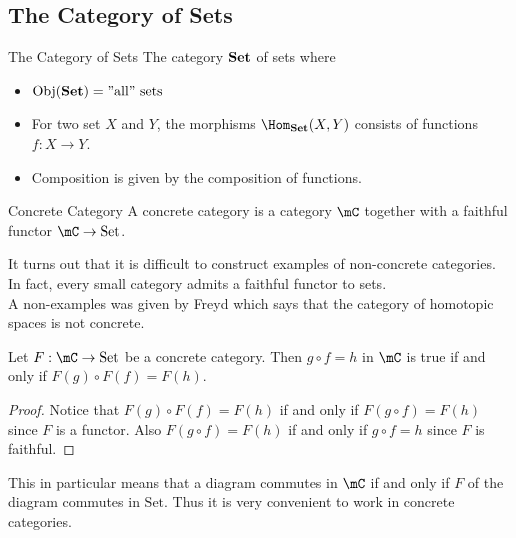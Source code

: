 \documentclass[a4paper]{article}
\begin{document}
\subsection{The Category of Sets}
\begin{defn}{The Category of Sets}{} The category $\bold{Set}$ of sets where 
\begin{itemize}
\item $\text{Obj}(\bold{Set})=\text{''all'' sets}$
\item For two set $X$ and $Y$, the morphisms $\Hom_\bold{Set}(X,Y)$ consists of functions $f:X\to Y$. 
\item Composition is given by the composition of functions. 
\end{itemize}
\end{defn}

\begin{defn}{Concrete Category}{} A concrete category is a category $\mC$ together with a faithful functor $\mC\to\text{Set}$. 
\end{defn}

It turns out that it is difficult to construct examples of non-concrete categories. In fact, every small category admits a faithful functor to sets. \\
A non-examples was given by Freyd which says that the category of homotopic spaces is not concrete. 

\begin{prp}{}{} Let $F:\mC\to\text{Set}$ be a concrete category. Then $g\circ f=h$ in $\mC$ is true if and only if $F(g)\circ F(f)=F(h)$. 
\begin{proof}
Notice that $F(g)\circ F(f)=F(h)$ if and only if $F(g\circ f)=F(h)$ since $F$ is a functor. Also $F(g\circ f)=F(h)$ if and only if $g\circ f=h$ since $F$ is faithful. 
\end{proof}
\end{prp}

This in particular means that a diagram commutes in $\mC$ if and only if $F$ of the diagram commutes in $\text{Set}$. Thus it is very convenient to work in concrete categories. 
\end{document}
